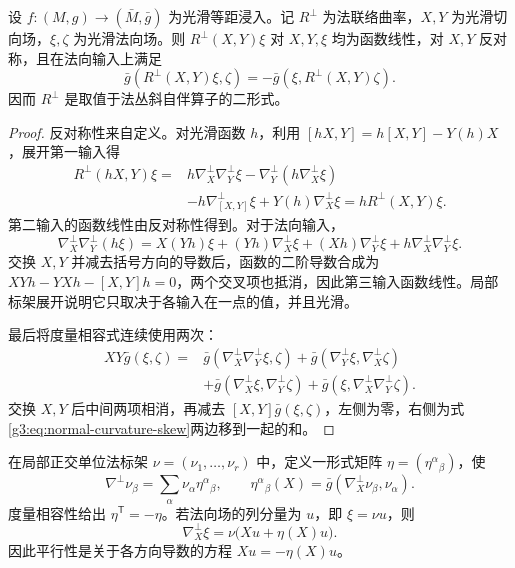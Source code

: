 \begin{proposition}\label{g3:prop:normal-connection-curvature}
	设 \(f:(M,g)\to(\bar M,\bar g)\) 为光滑等距浸入。记 \(R^\perp\) 为法联络曲率，\(X,Y\) 为光滑切向场，\(\xi,\zeta\) 为光滑法向场。则 \(R^\perp(X,Y)\xi\) 对 \(X,Y,\xi\) 均为函数线性，对 \(X,Y\) 反对称，且在法向输入上满足
	\begin{equation}\label{g3:eq:normal-curvature-skew}
		\bar g(R^\perp(X,Y)\xi,\zeta)
		=-\bar g(\xi,R^\perp(X,Y)\zeta).
	\end{equation}
	因而 \(R^\perp\) 是取值于法丛斜自伴算子的二形式。
\end{proposition}
\begin{proof}
	反对称性来自定义。对光滑函数 \(h\)，利用
	\([hX,Y]=h[X,Y]-Y(h)X\)，展开第一输入得
	\[
		\begin{aligned}
			R^\perp(hX,Y)\xi
			={}&h\nabla^\perp_X\nabla^\perp_Y\xi
				-\nabla^\perp_Y(h\nabla^\perp_X\xi)\\
			&-h\nabla^\perp_{[X,Y]}\xi
				+Y(h)\nabla^\perp_X\xi
			=hR^\perp(X,Y)\xi.
		\end{aligned}
	\]
	第二输入的函数线性由反对称性得到。对于法向输入，
	\[
		\nabla^\perp_X\nabla^\perp_Y(h\xi)
		=X(Yh)\xi+(Yh)\nabla^\perp_X\xi
			+(Xh)\nabla^\perp_Y\xi
			+h\nabla^\perp_X\nabla^\perp_Y\xi.
	\]
	交换 \(X,Y\) 并减去括号方向的导数后，函数的二阶导数合成为
	\(XYh-YXh-[X,Y]h=0\)，两个交叉项也抵消，因此第三输入函数线性。局部标架展开说明它只取决于各输入在一点的值，并且光滑。

	最后将度量相容式连续使用两次：
	\[
		\begin{aligned}
			XY\bar g(\xi,\zeta)
			={}&\bar g(\nabla^\perp_X\nabla^\perp_Y\xi,\zeta)
				+\bar g(\nabla^\perp_Y\xi,\nabla^\perp_X\zeta)\\
			&+\bar g(\nabla^\perp_X\xi,\nabla^\perp_Y\zeta)
				+\bar g(\xi,\nabla^\perp_X\nabla^\perp_Y\zeta).
		\end{aligned}
	\]
	交换 \(X,Y\) 后中间两项相消，再减去 \([X,Y]\bar g(\xi,\zeta)\)，左侧为零，右侧为式\eqref{g3:eq:normal-curvature-skew}两边移到一起的和。
\end{proof}

在局部正交单位法标架 \(\nu=(\nu_1,\ldots,\nu_r)\) 中，定义一形式矩阵 \(\eta=(\eta^\alpha{}_\beta)\)，使
\begin{equation}\label{g3:eq:normal-connection-matrix}
	\nabla^\perp\nu_\beta=\sum_\alpha\nu_\alpha\eta^\alpha{}_\beta,
	\qquad \eta^\alpha{}_\beta(X)=\bar g(\nabla^\perp_X\nu_\beta,\nu_\alpha).
\end{equation}
度量相容性给出 \(\eta^{\mathsf T}=-\eta\)。若法向场的列分量为 \(u\)，即 \(\xi=\nu u\)，则
\[
	\nabla^\perp_X\xi=\nu\bigl(Xu+\eta(X)u\bigr).
\]
因此平行性是关于各方向导数的方程 \(Xu=-\eta(X)u\)。


